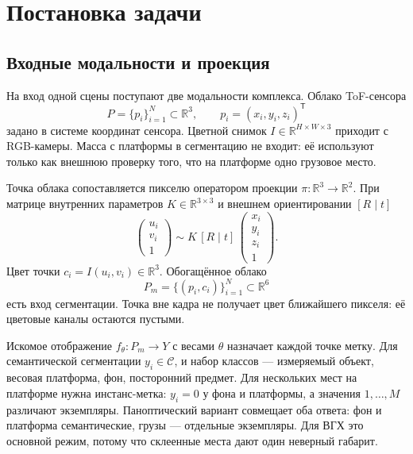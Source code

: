 \documentclass{misisarticle}
\begin{document}
\section{Постановка задачи}

\subsection{Входные модальности и проекция}

На вход одной сцены поступают две модальности комплекса. Облако ToF-сенсора
\begin{equation}
P = \{p_i\}_{i=1}^{N} \subset \mathbb{R}^{3}, \qquad
p_i = (x_i, y_i, z_i)^{\mathsf{T}}
\label{eq:cloud}
\end{equation}
задано в системе координат сенсора. Цветной снимок $I \in \mathbb{R}^{H \times W \times 3}$ приходит с RGB-камеры. Масса с платформы в сегментацию не входит: её используют только как внешнюю проверку того, что на платформе одно грузовое место.

Точка облака сопоставляется пикселю оператором проекции $\pi \colon \mathbb{R}^{3} \to \mathbb{R}^{2}$. При матрице внутренних параметров $K \in \mathbb{R}^{3 \times 3}$ и внешнем ориентировании $[R \mid t]$
\begin{equation}
\begin{pmatrix} u_i \\ v_i \\ 1 \end{pmatrix}
\sim
K \,[R \mid t]\,
\begin{pmatrix} x_i \\ y_i \\ z_i \\ 1 \end{pmatrix}.
\label{eq:proj}
\end{equation}
Цвет точки $c_i = I(u_i, v_i) \in \mathbb{R}^{3}$. Обогащённое облако
\begin{equation}
P_m = \{(p_i, c_i)\}_{i=1}^{N} \subset \mathbb{R}^{6}
\label{eq:pm}
\end{equation}
есть вход сегментации. Точка вне кадра не получает цвет ближайшего пикселя: её цветовые каналы остаются пустыми.

Искомое отображение $f_{\theta} \colon P_m \to Y$ с весами $\theta$ назначает каждой точке метку. Для семантической сегментации $y_i \in \mathcal{C}$, и набор классов --- измеряемый объект, весовая платформа, фон, посторонний предмет. Для нескольких мест на платформе нужна инстанс-метка: $y_i = 0$ у фона и платформы, а значения $1, \ldots, M$ различают экземпляры. Паноптический вариант совмещает оба ответа: фон и платформа семантические, грузы --- отдельные экземпляры. Для ВГХ это основной режим, потому что склеенные места дают один неверный габарит.
\end{document}
